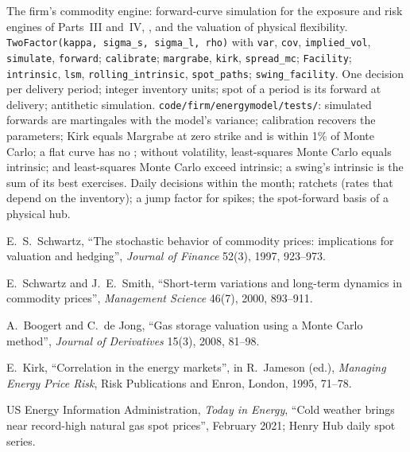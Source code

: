 \begin{build}
 The firm's commodity engine: forward-curve simulation for the exposure and
risk engines of Parts~III and~IV, , and the valuation of physical
flexibility.
 \texttt{TwoFactor(kappa, sigma\_s, sigma\_l, rho)} with \texttt{var},
\texttt{cov}, \texttt{implied\_vol}, \texttt{simulate}, \texttt{forward};
\texttt{calibrate}; \texttt{margrabe}, \texttt{kirk}, \texttt{spread\_mc};
\texttt{Facility}; \texttt{intrinsic}, \texttt{lsm}, \texttt{rolling\_intrinsic},
\texttt{spot\_paths}; \texttt{swing\_facility}.
 One decision per delivery period; integer inventory units; spot of a period
is its forward at delivery; antithetic simulation.
 \texttt{code/firm/energymodel/tests/}: simulated forwards are
martingales with the model's variance; calibration recovers the parameters; Kirk equals
Margrabe at zero strike and is within 1\% of Monte Carlo; a flat curve has no ; without volatility, least-squares Monte Carlo equals intrinsic;  and least-squares Monte Carlo exceed intrinsic; a swing's intrinsic is the sum of
its best exercises.
 Daily decisions within the month; ratchets (rates that depend on the
inventory); a jump factor for spikes; the spot-forward basis of a physical hub.
\end{build}

\begin{omsources}
\item E.\ S.\ Schwartz, ``The stochastic behavior of commodity prices: implications for
valuation and hedging'', \emph{Journal of Finance} 52(3), 1997, 923--973.
\item E.\ Schwartz and J.\ E.\ Smith, ``Short-term variations and long-term dynamics in
commodity prices'', \emph{Management Science} 46(7), 2000, 893--911.
\item A.\ Boogert and C.\ de Jong, ``Gas storage valuation using a Monte Carlo method'',
\emph{Journal of Derivatives} 15(3), 2008, 81--98.
\item E.\ Kirk, ``Correlation in the energy markets'', in R.\ Jameson (ed.), \emph{Managing Energy Price
Risk}, Risk Publications and Enron, London, 1995, 71--78.
\item US Energy Information Administration, \emph{Today in Energy}, ``Cold weather brings
near record-high natural gas spot prices'', February 2021; Henry Hub daily spot series.
\end{omsources}

